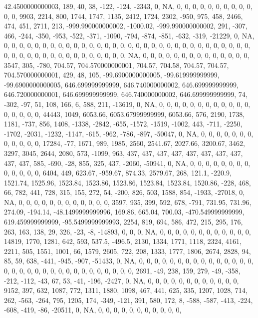 \documentclass[
]{article}
\begin{document}
42.4500000000003, 189, 40, 38, -122, -124, -2343, 0, NA, 0, 0, 0, 0, 0,
0, 0, 0, 0, 0, 0, 0, 9903, 2214, 800, 1744, 1747, 1135, 2412, 1724,
2302, -950, 975, 458, 2466, 474, 451, 2711, 213, -999.990000000002,
-1000.02, -999.990000000002, 291, -307, 466, -244, -350, -953, -522,
-371, -1090, -794, -874, -851, -632, -319, -21229, 0, NA, 0, 0, 0, 0, 0,
0, 0, 0, 0, 0, 0, 0, 0, 0, 0, 0, 0, 0, 0, 0, 0, 0, 0, 0, 0, 0, 0, 0, 0,
0, 0, 0, 0, 0, 0, 0, 0, 0, 0, 0, 0, 0, 0, 0, 0, 0, 0, 0, NA, 0, 0, 0, 0,
0, 0, 0, 0, 0, 0, 0, 0, 0, 0, 3547, 305, -780, 704.57, 704.570000000001,
704.57, 704.58, 704.57, 704.57, 704.570000000001, 429, 48, 105,
-99.6900000000005, -99.619999999999, -99.6900000000005,
646.699999999999, 646.740000000002, 646.699999999999, 646.720000000001,
646.699999999999, 646.740000000002, 646.699999999999, 74, -302, -97, 51,
108, 166, 6, 588, 211, -13619, 0, NA, 0, 0, 0, 0, 0, 0, 0, 0, 0, 0, 0,
0, 0, 0, 0, 0, 0, 44443, 1049, 6053.66, 6053.67999999999, 6053.66, 576,
2190, 1738, 1181, -737, 856, 1408, -1338, -2842, -655, -1572, -1519,
-1002, 443, -711, -2250, -1702, -2031, -1232, -1147, -615, -962, -786,
-897, -50047, 0, NA, 0, 0, 0, 0, 0, 0, 0, 0, 0, 0, 0, 0, 17284, -77,
1671, 989, 1985, 2560, 2541.67, 2027.66, 3200.67, 3462, 3297, 3045,
2644, 2080, 573, -1099, 963, 437, 437, 437, 437, 437, 437, 437, 437,
437, 437, 585, -690, -28, 855, 325, 437, -2060, -50941, 0, NA, 0, 0, 0,
0, 0, 0, 0, 0, 0, 0, 0, 0, 0, 6404, 449, 623.67, -959.67, 874.33,
2579.67, 268, 121.1, -220.9, 1521.74, 1525.96, 1523.84, 1523.86,
1523.86, 1523.84, 1523.84, 1520.86, -228, 468, 66, 782, 441, 728, 315,
155, 272, 54, -200, 826, 503, 1588, 854, -1933, -27018, 0, NA, 0, 0, 0,
0, 0, 0, 0, 0, 0, 0, 0, 0, 3597, 935, 399, 592, 678, -791, 731.95,
731.96, 274.09, -194.14, -48.1499999999996, 169.86, 665.04, 700.03,
-470.549999999999, 619.459999999999, -95.5499999999993, 2254, 819, 694,
586, 472, 215, 295, 176, 263, 163, 138, 29, 326, -23, -8, -14893, 0, 0,
0, NA, 0, 0, 0, 0, 0, 0, 0, 0, 0, 0, 0, 0, 14819, 1770, 1281, 642, 593,
537.5, -496.5, 2130, 1334, 1771, 1118, 2324, 4161, 2211, 505, 1551,
1001, 66, 1579, 2605, 722, 208, 1333, 1777, 1806, 2674, 2828, 94, 85,
59, 638, -441, -945, -907, -51433, 0, NA, 0, 0, 0, 0, 0, 0, 0, 0, 0, 0,
0, 0, 0, 0, 0, 0, 0, 0, 0, 0, 0, 0, 0, 0, 0, 0, 0, 0, 0, 0, 0, 0, 2691,
-49, 238, 159, 279, -49, -358, -212, -112, -43, 67, 53, -41, -196,
-2427, 0, NA, 0, 0, 0, 0, 0, 0, 0, 0, 0, 0, 0, 0, 9152, 397, 632, 1087,
772, 1311, 1880, 1098, 467, 441, 625, 335, 1207, 1028, 714, 262, -563,
-264, 795, 1205, 174, -349, -121, 391, 580, 172, 8, -588, -587, -413,
-224, -608, -419, -86, -20511, 0, NA, 0, 0, 0, 0, 0, 0, 0, 0, 0, 0, 0,
\end{document}

